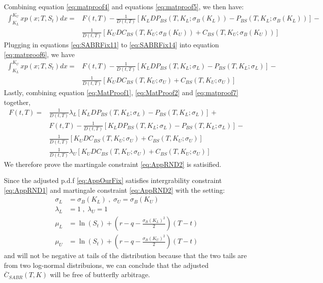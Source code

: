 \documentclass[letterpaper,12pt,titlepage,oneside,final]{book}
\numberwithin{equation}{section}
\theoremstyle{definition}
\begin{document}
Combining equation \eqref{eq:matproof4} and equations \eqref{eq:matproof5}, we then have:
\begin{equation}
	\begin{split}
		\int_{K_L}^{K_U} x p(x;T,S_t)dx=
	   &F(t,T)-\frac{1}{D(t,T)}[K_{L}DP_{BS}(T,K_{L};\sigma_{B}(K_{L}))-P_{BS}(T,K_{L};\sigma_{B}(K_{L}))]-\\
	   &\frac{1}{D(t,T)}[K_{U}DC_{BS}(T,K_{U};\sigma_{B}(K_{U}))+C_{BS}(T,K_{U};\sigma_{B}(K_{U}))]
	   \end{split}
	   \label{eq:matproof6}
\end{equation}
Plugging in equations \eqref{eq:SABRFix11} to \eqref{eq:SABRFix14} into equation \eqref{eq:matproof6}, we have 
\begin{equation}
	\begin{split}
		\int_{K_L}^{K_U} x p(x;T,S_t)dx=
	   &F(t,T)-\frac{1}{D(t,T)}[K_{L}DP_{BS}(T,K_{L};\sigma_{L})-P_{BS}(T,K_{L};\sigma_{L})]-\\
	   &\frac{1}{D(t,T)}[K_{U}DC_{BS}(T,K_{U};\sigma_U)+C_{BS}(T,K_{U};\sigma_{U})]
	   \end{split}
	   \label{eq:matproof7}
\end{equation}
Lastly, combining equation \eqref{eq:MatProof1}, \eqref{eq:MatProof2} and  \eqref{eq:matproof7} together, 
\begin{equation}
	\begin{split}
	   F(t,T)=&\frac{1}{D(t,T)}\lambda_L[K_{L}DP_{BS}(T,K_{L};\sigma_{L})-P_{BS}(T,K_{L};\sigma_{L})]+\\
	   &F(t,T)-\frac{1}{D(t,T)}[K_{L}DP_{BS}(T,K_{L};\sigma_{L})-P_{BS}(T,K_{L};\sigma_{L})]-\\
	   &\frac{1}{D(t,T)}[K_{U}DC_{BS}(T,K_{U};\sigma_U)+C_{BS}(T,K_{U};\sigma_{U})]\\
	   &\frac{1}{D(t,T)}\lambda_U[K_{U}DC_{BS}(T,K_{U};\sigma_{U})+C_{BS}(T,K_{U};\sigma_{U})]
	   \end{split}
   \label{eq:RND6}
\end{equation}
We therefore prove the martingale  constraint \eqref{eq:AppRND2} is satisified.

Since the adjusted p.d.f \eqref{eq:AppOurFix} satisfies intergrability constraint \eqref{eq:AppRND1} and martingale  constraint \eqref{eq:AppRND2}
with the setting:
\begin{equation}
	\begin{split}
		\sigma_{L}&=\sigma_{B}(K_L)\;,\;\sigma_{U}=\sigma_{B}(K_U)\\
		\lambda_{L}&=1 \;,\;\lambda_{U}=1\\
		\mu_L&=\ln(S_t)+(r-q-\frac{\sigma_{B}(K_L)^2}{2})(T-t)\\ 
		\mu_U&=\ln(S_t)+(r-q-\frac{\sigma_{B}(K_U)^2}{2})(T-t)
	\end{split}
	\label{eq:AppSolSABRFix}
	\end{equation}
and will not be negative at tails of the distribution because that the two tails are from two log-normal distribuions, we can conclude that the adjusted $\overline{C}_{SABR}(T,K)$ will be free of butterfly arbitrage.
\end{document}

